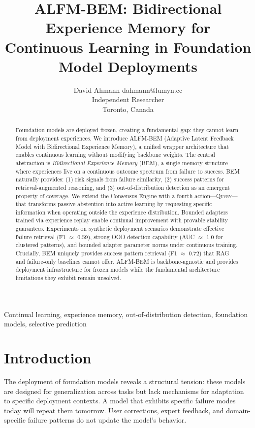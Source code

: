 \documentclass[twoside,11pt]{article}
\title{ALFM-BEM: Bidirectional Experience Memory for\\Continuous Learning in Foundation Model Deployments}
\author{\name David Ahmann \email dahmann@lumyn.cc \\
       \addr Independent Researcher\\
       Toronto, Canada}
\begin{document}
\maketitle

\begin{abstract}
Foundation models are deployed frozen, creating a fundamental gap: they cannot learn from deployment experiences. We introduce ALFM-BEM (Adaptive Latent Feedback Model with Bidirectional Experience Memory), a unified wrapper architecture that enables continuous learning without modifying backbone weights. The central abstraction is \emph{Bidirectional Experience Memory} (BEM), a single memory structure where experiences live on a continuous outcome spectrum from failure to success. BEM naturally provides: (1) risk signals from failure similarity, (2) success patterns for retrieval-augmented reasoning, and (3) out-of-distribution detection as an emergent property of coverage. We extend the Consensus Engine with a fourth action---\textsc{Query}---that transforms passive abstention into active learning by requesting specific information when operating outside the experience distribution. Bounded adapters trained via experience replay enable continual improvement with provable stability guarantees. Experiments on synthetic deployment scenarios demonstrate effective failure retrieval (F1 $\approx$ 0.59), strong OOD detection capability (AUC $\approx$ 1.0 for clustered patterns), and bounded adapter parameter norms under continuous training. Crucially, BEM uniquely provides success pattern retrieval (F1 $\approx$ 0.72) that RAG and failure-only baselines cannot offer. ALFM-BEM is backbone-agnostic and provides deployment infrastructure for frozen models while the fundamental architecture limitations they exhibit remain unsolved.
\end{abstract}

\begin{keywords}
Continual learning, experience memory, out-of-distribution detection, foundation models, selective prediction
\end{keywords}

\section{Introduction}
\label{sec:intro}

The deployment of foundation models reveals a structural tension: these models are designed for generalization across tasks but lack mechanisms for adaptation to specific deployment contexts. A model that exhibits specific failure modes today will repeat them tomorrow. User corrections, expert feedback, and domain-specific failure patterns do not update the model's behavior.
\end{document}
